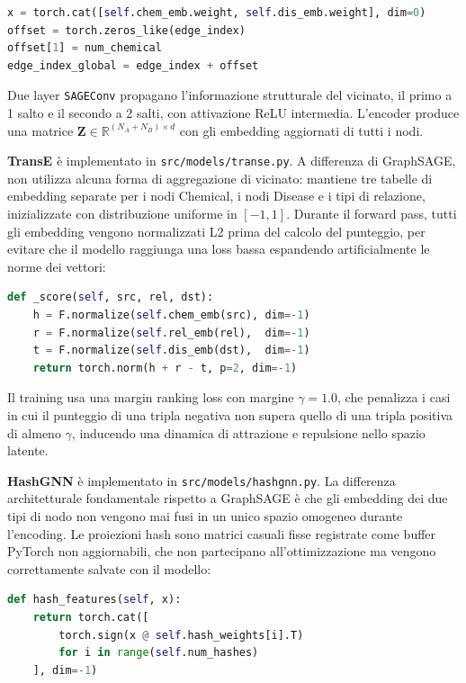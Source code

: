 \begin{lstlisting}[language=Python, caption={Fusione degli spazi di embedding con offset in GraphSAGE}]
x = torch.cat([self.chem_emb.weight, self.dis_emb.weight], dim=0)
offset = torch.zeros_like(edge_index)
offset[1] = num_chemical
edge_index_global = edge_index + offset
\end{lstlisting}

Due layer \texttt{SAGEConv} propagano l'informazione strutturale del vicinato, il primo a 1 salto e il secondo a 2 salti, con attivazione ReLU intermedia. L'encoder produce una matrice $\mathbf{Z} \in \mathbb{R}^{(N_A + N_B) \times d}$ con gli embedding aggiornati di tutti i nodi.

\textbf{TransE} è implementato in \texttt{src/models/transe.py}. A differenza di GraphSAGE, non utilizza alcuna forma di aggregazione di vicinato: mantiene tre tabelle di embedding separate per i nodi Chemical, i nodi Disease e i tipi di relazione, inizializzate con distribuzione uniforme in $[-1, 1]$. Durante il forward pass, tutti gli embedding vengono normalizzati L2 prima del calcolo del punteggio, per evitare che il modello raggiunga una loss bassa espandendo artificialmente le norme dei vettori:

\begin{lstlisting}[language=Python, caption={Funzione di scoring di TransE}]
def _score(self, src, rel, dst):
    h = F.normalize(self.chem_emb(src), dim=-1)
    r = F.normalize(self.rel_emb(rel),  dim=-1)
    t = F.normalize(self.dis_emb(dst),  dim=-1)
    return torch.norm(h + r - t, p=2, dim=-1)
\end{lstlisting}

Il training usa una margin ranking loss con margine $\gamma = 1.0$, che penalizza i casi in cui il punteggio di una tripla negativa non supera quello di una tripla positiva di almeno $\gamma$, inducendo una dinamica di attrazione e repulsione nello spazio latente.

\textbf{HashGNN} è implementato in \texttt{src/models/hashgnn.py}. La differenza architetturale fondamentale rispetto a GraphSAGE è che gli embedding dei due tipi di nodo non vengono mai fusi in un unico spazio omogeneo durante l'encoding. Le proiezioni hash sono matrici casuali fisse registrate come buffer PyTorch non aggiornabili, che non partecipano all'ottimizzazione ma vengono correttamente salvate con il modello:

\begin{lstlisting}[language=Python, caption={Funzione di hashing LSH in HashGNN}]
def hash_features(self, x):
    return torch.cat([
        torch.sign(x @ self.hash_weights[i].T)
        for i in range(self.num_hashes)
    ], dim=-1)
\end{lstlisting}

